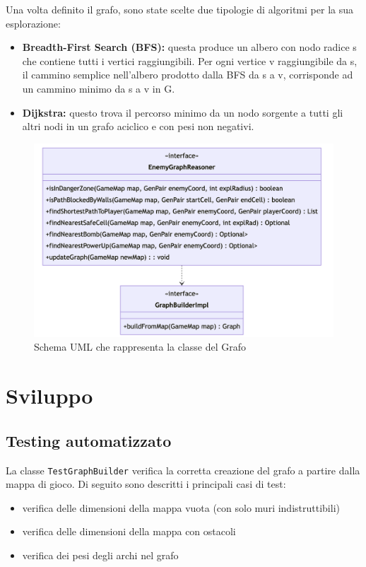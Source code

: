 \documentclass[a4paper,12pt]{report}
\begin{document}
\par
Una volta definito il grafo, sono state scelte due tipologie di algoritmi per la sua esplorazione:
\begin{itemize}
    \item \textbf{Breadth-First Search (BFS):} questa produce un albero con nodo radice s che contiene tutti i vertici raggiungibili. Per ogni vertice v raggiungibile da s, il cammino semplice nell’albero prodotto dalla BFS da s a v, corrisponde ad un cammino minimo da s a v in G.
    \item \textbf{Dijkstra:} questo trova il percorso minimo da un nodo sorgente a tutti gli altri nodi in un grafo aciclico e con pesi non negativi.
\end{itemize}

\begin{figure}[h]
\centering{}
\includegraphics[width=\textwidth]{img/enemyGraph.png}
\caption{Schema UML che rappresenta la classe del Grafo}
\end{figure}

\chapter{Sviluppo}
\section{Testing automatizzato}

\par
La classe \texttt{TestGraphBuilder} verifica la corretta creazione del grafo a partire dalla mappa di gioco. Di seguito sono descritti i principali casi di test:
\begin{itemize}
    \item verifica delle dimensioni della mappa vuota (con solo muri indistruttibili)
    \item verifica delle dimensioni della mappa con ostacoli
    \item verifica dei pesi degli archi nel grafo
\end{itemize}
\end{document}
